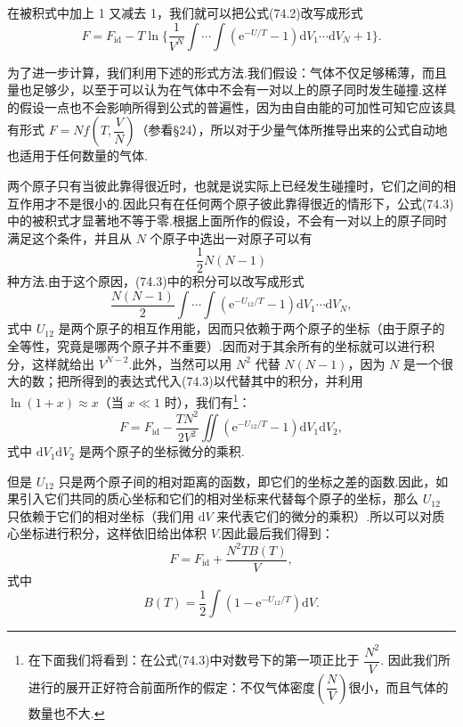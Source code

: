 在被积式中加上 1 又减去 1，我们就可以把公式(74.2)改写成形式
\begin{equation}
  F=F_{\mathrm{id}}-T\ln\biggl\{\frac{1}{V^N}\int\cdots\int
  \left(\mathrm{e}^{-U/T}-1\right)\mathrm{d}V_1\cdots\mathrm{d}V_N+1\biggr\}.
\end{equation}

为了进一步计算，我们利用下述的形式方法.我们假设：气体不仅足够稀薄，而且量也足够少，以至于可以认为在气体中不会有一对以上的原子同时发生碰撞.这样的假设一点也不会影响所得到公式的普遍性，因为由自由能的可加性可知它应该具有形式 $F=Nf\left(T,\dfrac{V}{N}\right)$（参看§24），所以对于少量气体所推导出来的公式自动地也适用于任何数量的气体.

两个原子只有当彼此靠得很近时，也就是说实际上已经发生碰撞时，它们之间的相互作用才不是很小的.因此只有在任何两个原子彼此靠得很近的情形下，公式(74.3)中的被积式才显著地不等于零.根据上面所作的假设，不会有一对以上的原子同时满足这个条件，并且从 $N$ 个原子中选出一对原子可以有
\begin{equation*}
  \frac{1}{2}N(N-1)
\end{equation*}
种方法.由于这个原因，(74.3)中的积分可以改写成形式
\begin{equation*}
  \frac{N(N-1)}{2}\int\cdots\int\left(\mathrm{e}^{-U_{12}/T}-1\right)\mathrm{d}V_1\cdots\mathrm{d}V_N,
\end{equation*}
式中 $U_{12}$ 是两个原子的相互作用能，因而只依赖于两个原子的坐标（由于原子的全等性，究竟是哪两个原子并不重要）.因而对于其余所有的坐标就可以进行积分，这样就给出 $V^{N-2}$.此外，当然可以用 $N^2$ 代替 $N(N-1)$，因为 $N$ 是一个很大的数；把所得到的表达式代入(74.3)以代替其中的积分，并利用 $\ln(1+x)\approx x$（当 $x\ll1$ 时），我们有\footnote{在下面我们将看到：在公式(74.3)中对数号下的第一项正比于 $\dfrac{N^2}{V}$. 因此我们所进行的展开正好符合前面所作的假定：不仅气体密度$\left(\dfrac{N}{V}\right)$很小，而且气体的数量也不大.}：
\begin{equation*}
  F=F_{\mathrm{id}}-\frac{TN^2}{2V^2}\iint\left(\mathrm{e}^{-U_{12}/T}-1\right)\mathrm{d}V_1\mathrm{d}V_2,
\end{equation*}
式中 $\mathrm{d}V_1\mathrm{d}V_2$ 是两个原子的坐标微分的乘积.

但是 $U_{12}$ 只是两个原子间的相对距离的函数，即它们的坐标之差的函数.因此，如果引入它们共同的质心坐标和它们的相对坐标来代替每个原子的坐标，那么 $U_{12}$ 只依赖于它们的相对坐标（我们用 $\mathrm{d}V$ 来代表它们的微分的乘积）.所以可以对质心坐标进行积分，这样依旧给出体积 $V$.因此最后我们得到：
\begin{equation}
  F=F_{\mathrm{id}}+\frac{N^2TB(T)}{V},
\end{equation}
式中
\begin{equation}
  B(T)=\frac{1}{2}\int\left(1-\mathrm{e}^{-U_{12}/T}\right)\mathrm{d}V.
\end{equation}

